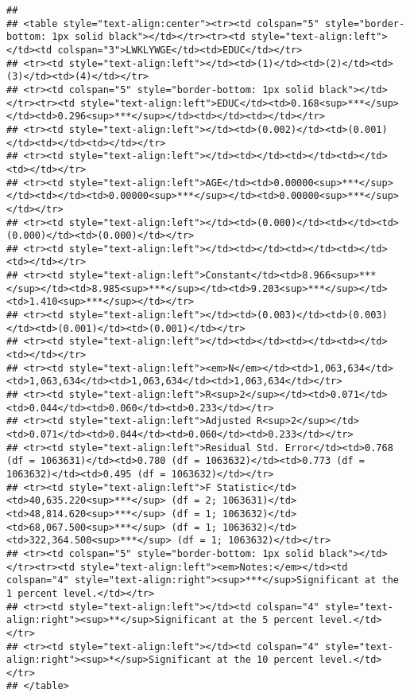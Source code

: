 \documentclass[
]{article}
\begin{document}
\begin{verbatim}
## 
## <table style="text-align:center"><tr><td colspan="5" style="border-bottom: 1px solid black"></td></tr><tr><td style="text-align:left"></td><td colspan="3">LWKLYWGE</td><td>EDUC</td></tr>
## <tr><td style="text-align:left"></td><td>(1)</td><td>(2)</td><td>(3)</td><td>(4)</td></tr>
## <tr><td colspan="5" style="border-bottom: 1px solid black"></td></tr><tr><td style="text-align:left">EDUC</td><td>0.168<sup>***</sup></td><td>0.296<sup>***</sup></td><td></td><td></td></tr>
## <tr><td style="text-align:left"></td><td>(0.002)</td><td>(0.001)</td><td></td><td></td></tr>
## <tr><td style="text-align:left"></td><td></td><td></td><td></td><td></td></tr>
## <tr><td style="text-align:left">AGE</td><td>0.00000<sup>***</sup></td><td></td><td>0.00000<sup>***</sup></td><td>0.00000<sup>***</sup></td></tr>
## <tr><td style="text-align:left"></td><td>(0.000)</td><td></td><td>(0.000)</td><td>(0.000)</td></tr>
## <tr><td style="text-align:left"></td><td></td><td></td><td></td><td></td></tr>
## <tr><td style="text-align:left">Constant</td><td>8.966<sup>***</sup></td><td>8.985<sup>***</sup></td><td>9.203<sup>***</sup></td><td>1.410<sup>***</sup></td></tr>
## <tr><td style="text-align:left"></td><td>(0.003)</td><td>(0.003)</td><td>(0.001)</td><td>(0.001)</td></tr>
## <tr><td style="text-align:left"></td><td></td><td></td><td></td><td></td></tr>
## <tr><td style="text-align:left"><em>N</em></td><td>1,063,634</td><td>1,063,634</td><td>1,063,634</td><td>1,063,634</td></tr>
## <tr><td style="text-align:left">R<sup>2</sup></td><td>0.071</td><td>0.044</td><td>0.060</td><td>0.233</td></tr>
## <tr><td style="text-align:left">Adjusted R<sup>2</sup></td><td>0.071</td><td>0.044</td><td>0.060</td><td>0.233</td></tr>
## <tr><td style="text-align:left">Residual Std. Error</td><td>0.768 (df = 1063631)</td><td>0.780 (df = 1063632)</td><td>0.773 (df = 1063632)</td><td>0.495 (df = 1063632)</td></tr>
## <tr><td style="text-align:left">F Statistic</td><td>40,635.220<sup>***</sup> (df = 2; 1063631)</td><td>48,814.620<sup>***</sup> (df = 1; 1063632)</td><td>68,067.500<sup>***</sup> (df = 1; 1063632)</td><td>322,364.500<sup>***</sup> (df = 1; 1063632)</td></tr>
## <tr><td colspan="5" style="border-bottom: 1px solid black"></td></tr><tr><td style="text-align:left"><em>Notes:</em></td><td colspan="4" style="text-align:right"><sup>***</sup>Significant at the 1 percent level.</td></tr>
## <tr><td style="text-align:left"></td><td colspan="4" style="text-align:right"><sup>**</sup>Significant at the 5 percent level.</td></tr>
## <tr><td style="text-align:left"></td><td colspan="4" style="text-align:right"><sup>*</sup>Significant at the 10 percent level.</td></tr>
## </table>
\end{verbatim}
\end{document}
